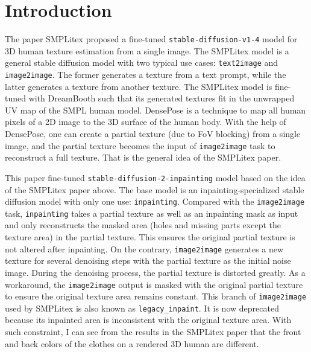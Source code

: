 \documentclass[acmtog]{acmart}
\begin{document}


\maketitle

\section{Introduction}

The paper SMPLitex \cite{casas2023smplitex} proposed a fine-tuned \texttt{stable-diffusion-v1-4} model for 3D human texture estimation from a single image. The SMPLitex model is a general stable diffusion model with two typical use cases: \texttt{text2image} and \texttt{image2image}. The former generates a texture from a text prompt, while the latter generates a texture from another texture. The SMPLitex model is fine-tuned with DreamBooth such that its generated textures fit in the unwrapped UV map of the SMPL human model. DensePose \cite{guler2018densepose} is a technique to map all human pixels of a 2D image to the 3D surface of the human body. With the help of DensePose, one can create a partial texture (due to FoV blocking) from a single image, and the partial texture becomes the input of \texttt{image2image} task to reconstruct a full texture. That is the general idea of the SMPLitex paper.

This paper fine-tuned \texttt{stable-diffusion-2-inpainting} model based on the idea of the SMPLitex paper above. The base model is an inpainting-specialized stable diffusion model with only one use: \texttt{inpainting}. Compared with the \texttt{image2image} task, \texttt{inpainting} takes a partial texture as well as an inpainting mask as input and only reconstructs the masked area (holes and missing parts except the texture area) in the partial texture. This ensures the original partial texture is not altered after inpainting. On the contrary, \texttt{image2image} generates a new texture for several denoising steps with the partial texture as the initial noise image. During the denoising process, the partial texture is distorted greatly. As a workaround, the \texttt{image2image} output is masked with the original partial texture to ensure the original texture area remains constant. This branch of \texttt{image2image} used by SMPLitex is also known as \texttt{legacy\_inpaint}. It is now deprecated because its inpainted area is inconsistent with the original texture area. With such constraint, I can see from the results in the SMPLitex paper that the front and back colors of the clothes on a rendered 3D human are different.
\end{document}
